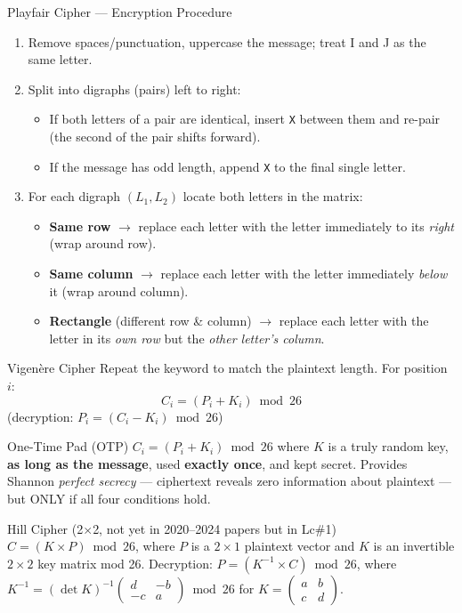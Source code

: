 \documentclass[12pt,a4paper]{article}
\begin{document}
\begin{algobox}{Playfair Cipher --- Encryption Procedure}
\begin{enumerate}[noitemsep]
  \item Remove spaces/punctuation, uppercase the message; treat I and J as the same letter.
  \item Split into digraphs (pairs) left to right:
    \begin{itemize}[noitemsep]
      \item If both letters of a pair are identical, insert \texttt{X} between them and re-pair (the second of the pair shifts forward).
      \item If the message has odd length, append \texttt{X} to the final single letter.
    \end{itemize}
  \item For each digraph $(L_1, L_2)$ locate both letters in the matrix:
    \begin{itemize}[noitemsep]
      \item \textbf{Same row} $\to$ replace each letter with the letter immediately to its \emph{right} (wrap around row).
      \item \textbf{Same column} $\to$ replace each letter with the letter immediately \emph{below} it (wrap around column).
      \item \textbf{Rectangle} (different row \& column) $\to$ replace each letter with the letter in its \emph{own row} but the \emph{other letter's column}.
    \end{itemize}
\end{enumerate}
\end{algobox}

\begin{algobox}{Vigen\`ere Cipher}
Repeat the keyword to match the plaintext length. For position $i$:
\[ C_i = (P_i + K_i) \bmod 26 \] \quad (decryption: $P_i = (C_i - K_i)\bmod 26$)
\end{algobox}

\begin{algobox}{One-Time Pad (OTP)}
$C_i = (P_i + K_i) \bmod 26$ where $K$ is a truly random key, \textbf{as long as the message}, used \textbf{exactly once}, and kept secret. Provides Shannon \emph{perfect secrecy} --- ciphertext reveals zero information about plaintext --- but ONLY if all four conditions hold.
\end{algobox}

\begin{algobox}{Hill Cipher (2$\times$2, not yet in 2020--2024 papers but in Lc\#1)}
$C = (K \times P) \bmod 26$, where $P$ is a $2\times1$ plaintext vector and $K$ is an invertible $2\times2$ key matrix mod 26.
Decryption: $P = (K^{-1} \times C)\bmod 26$, where $K^{-1}=(\det K)^{-1}\begin{pmatrix}d&-b\\-c&a\end{pmatrix}\bmod 26$ for $K=\begin{pmatrix}a&b\\c&d\end{pmatrix}$.
\end{algobox}
\end{document}
